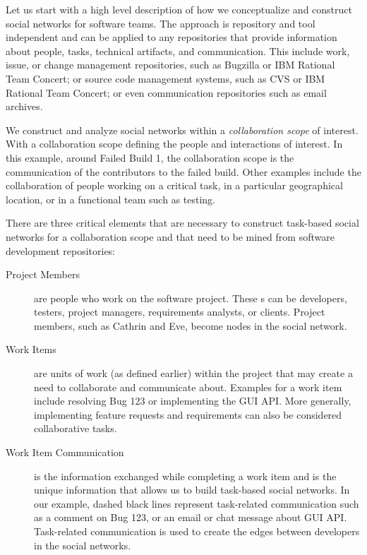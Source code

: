 Let us start with a high level description of how we conceptualize and construct social networks for software teams. 
The approach is repository and tool independent and can be applied to any repositories that provide information about people, tasks, technical artifacts, and communication. 
This include work, issue, or change management repositories, such as Bugzilla or IBM Rational Team Concert; or source code management systems, such as CVS or IBM Rational Team Concert; or even communication repositories such as email archives.

We construct and analyze social networks within a \emph{collaboration scope} of interest.
With a collaboration scope defining the people and interactions of interest.
In this example, around Failed Build 1, the collaboration scope is the communication of the contributors to the failed build. 
Other examples include the collaboration of people working on a critical task, in a particular geographical location, or in a functional team such as testing.

There are three critical elements that are necessary to construct task-based social networks for a collaboration scope and that need to be mined from software development repositories:

\begin{description}
\item[Project Members] are people who work on the software project. 
These \people s can be developers, testers, project managers, requirements analysts,
or clients. 
Project members, such as Cathrin and Eve, become nodes in the social network.

\item[Work Items] are units of work (as defined earlier) within the project that may create a need to collaborate and communicate about. 
Examples for a work item include resolving Bug  123 or implementing the GUI API. 
More generally, implementing feature requests and requirements can also be considered collaborative tasks.

\item[Work Item Communication] is the information exchanged while completing a work item and is the unique information that allows us to build task-based social networks. 
In our example, dashed black lines represent task-related communication such as a comment on Bug 123, or an email or chat message about GUI API.
Task-related communication is used to create the edges between developers in the social networks.
\end{description}

